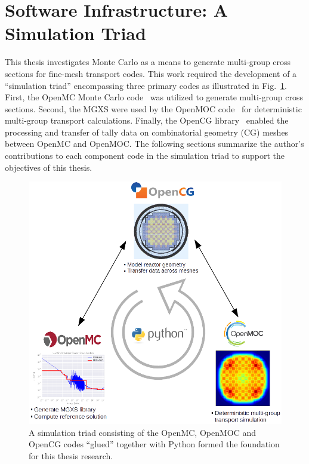 \documentclass[12pt,twoside]{mitthesis-exec}
\begin{document}
\section*{Software Infrastructure: A Simulation Triad}

This thesis investigates Monte Carlo as a means to generate multi-group cross sections for fine-mesh transport codes. This work required the development of a ``simulation triad'' encompassing three primary codes as illustrated in Fig.~\ref{fig:simulation-triad}. First, the OpenMC Monte Carlo code~\cite{romano2013openmc} was utilized to generate multi-group cross sections. Second, the MGXS were used by the OpenMOC code~\cite{boyd2014openmoc} for deterministic multi-group transport calculations. Finally, the OpenCG library~\cite{boyd2015opencg} enabled the processing and transfer of tally data on combinatorial geometry (CG) meshes between OpenMC and OpenMOC. The following sections summarize the author's contributions to each component code in the simulation triad to support the objectives of this thesis.

\begin{figure}[h!]
  \centering
  \includegraphics[width=0.95\linewidth]{figures/workflow/triad/simulation-triad}
\caption[A simulation triad of OpenMC, OpenMOC and OpenCG]{A simulation triad consisting of the OpenMC, OpenMOC and OpenCG codes ``glued'' together with Python formed the foundation for this thesis research.}
\label{fig:simulation-triad}
\end{figure}
\end{document}
